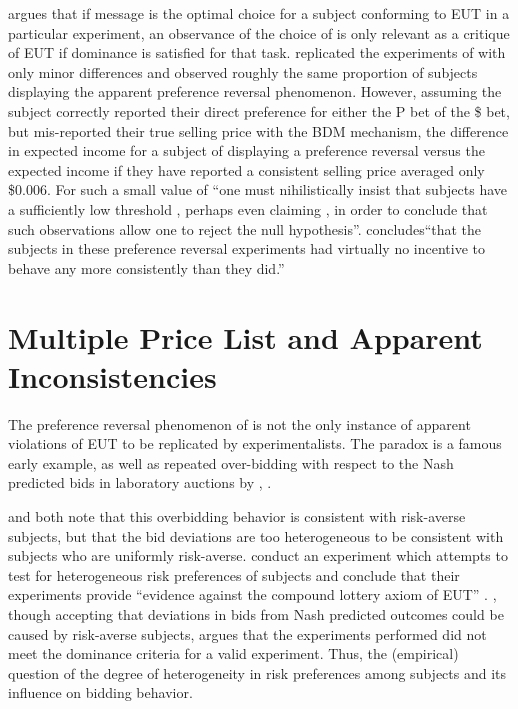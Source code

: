 \documentclass[../main.tex]{subfiles}
\begin{document}
\textcite{Harrison1989} argues that if message  is the optimal choice for a subject conforming to EUT in a particular experiment, an observance of the choice of  is only relevant as a critique of EUT if dominance is satisfied for that task.
\textcite{Harrison1994} replicated the experiments of\textcite{Grether1979} with only minor differences and observed roughly the same proportion of subjects displaying the apparent preference reversal phenomenon.
However, assuming the subject correctly reported their direct preference for either the P bet of the \$ bet, but mis-reported their true selling price with the BDM mechanism, the difference in expected income for a subject of displaying a preference reversal versus the expected income if they have reported a consistent selling price averaged only \$0.006. 
For such a small value of  \enquote{one must nihilistically insist that subjects have a sufficiently low threshold , perhaps even claiming , in order to conclude that such observations allow one to reject the null hypothesis}\parencite[1428]{Harrison1992}.
\textcite[237]{Harrison1994} concludes\enquote{that the subjects in these preference reversal experiments had virtually no incentive to behave any more consistently than they did.}

\section{\texorpdfstring{\textcite{Holt2002}}{Holt \& Laury (2002)} Multiple Price List and Apparent Inconsistencies}

The preference reversal phenomenon of \textcite{Grether1979} is not the only instance of apparent violations of EUT to be replicated by experimentalists.
The \textcite{Ellsberg1961} paradox is a famous early example, as well as repeated over-bidding with respect to the Nash predicted bids in laboratory auctions by \textcite{Cox1982}, \textcite{Cox1983, Cox1983a, Cox1988}.


\textcite[160]{Cox1985} and \textcite[749]{Harrison1989} both note that this overbidding behavior is consistent with risk-averse subjects, but that the bid deviations are too heterogeneous to be consistent with subjects who are uniformly risk-averse.
\textcite{Cox1985} conduct an experiment which attempts to test for heterogeneous risk preferences of subjects and conclude that their experiments provide \enquote{evidence against the compound lottery axiom of EUT} \parencite[165]{Cox1985}.
\textcite{Harrison1989}, though accepting that deviations in bids from Nash predicted outcomes could be caused by risk-averse subjects, argues that the experiments performed did not meet the dominance criteria for a valid experiment.
Thus, the (empirical) question of the degree of heterogeneity in risk preferences among subjects and its influence on bidding behavior.
\end{document}
